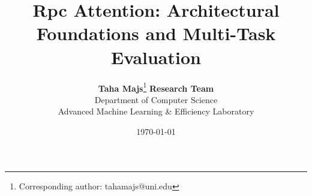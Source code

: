 \title{\textbf{Rpc Attention: Architectural Foundations and Multi-Task Evaluation}}

\author{
  \textbf{Taha Majs}\thanks{Corresponding author: tahamajs@uni.edu} \quad \textbf{Research Team} \\
  Department of Computer Science \\
  Advanced Machine Learning \& Efficiency Laboratory
}

\date{\today}
